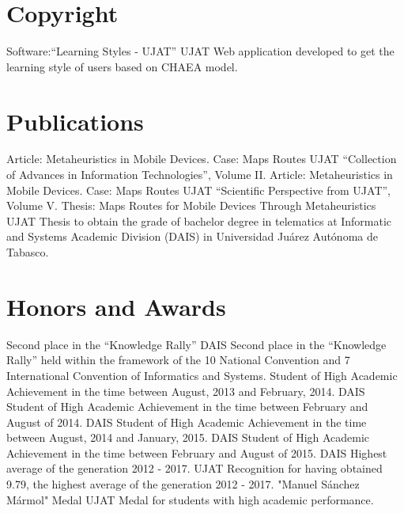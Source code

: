 \documentclass[]{friggeri-cv}
\begin{document}
\section{Copyright}
\begin{entrylist}
          {Software:“Learning Styles - UJAT”}
          {UJAT}
          {Web application developed to get the learning style of users based on CHAEA model.}
\end{entrylist}
\section{Publications}
\begin{entrylist}
          {Article: Metaheuristics in Mobile Devices. Case: Maps Routes}
          {UJAT}
          {“Collection of Advances in Information Technologies”, Volume II. }
          {Article: Metaheuristics in Mobile Devices. Case: Maps Routes}
          {UJAT}
          {“Scientific Perspective from UJAT”, Volume V.}
          {Thesis: Maps Routes for Mobile Devices Through Metaheuristics}
          {UJAT}
          {Thesis to obtain the grade of bachelor degree in telematics at Informatic and Systems Academic Division (DAIS) in Universidad Juárez Autónoma de Tabasco.}    
\end{entrylist}
\section{Honors and Awards}
\begin{entrylist}
          {Second place in the “Knowledge Rally”}
          {DAIS}
          {Second place in the “Knowledge Rally” held within the framework of the 10 National Convention and 7 International Convention of Informatics and Systems.}
          {Student of High Academic Achievement in the time between August, 2013 and February, 2014.}
          {DAIS}
          {}
          {Student of High Academic Achievement in the time between February and August of 2014.}
          {DAIS}
          {}
          {Student of High Academic Achievement in the time between August, 2014 and January, 2015.}
          {DAIS}
          {}
          {Student of High Academic Achievement in the time between February and August of 2015.}
          {DAIS}
          {}
          {Highest average of the generation 2012 - 2017.}
          {UJAT}
          {Recognition for having obtained 9.79, the highest average of the generation 2012 - 2017.}
          {"Manuel Sánchez Mármol" Medal}
          {UJAT}
          {Medal for students with high academic performance.}
\end{entrylist}
\newline
\newline
\newline
\newline
\newline
\newline
\newline
\newline
\newline
\newline
\end{document}
